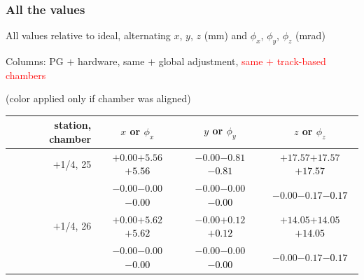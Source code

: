 \documentclass[compress]{beamer}
\begin{document}
\begin{frame}
\frametitle{All the values}
\tiny

All values relative to ideal, alternating $x$, $y$, $z$ (mm) and $\phi_x$, $\phi_y$, $\phi_z$ (mrad)

Columns: PG $+$ hardware, same $+$ global adjustment, \textcolor{red}{same $+$ track-based chambers}

\hfill (color applied only if chamber was aligned)

\vfill
\renewcommand{\arraystretch}{1.1}
\begin{tabular}{r | c | c | c}
station, chamber & $x$ or $\phi_x$ & $y$ or $\phi_y$ & $z$ or $\phi_z$ \\\hline
$+$1/4, 25 & $+0.00$\hspace{0.1 cm}$+5.56$\hspace{0.1 cm}\textcolor{black}{$+5.56$} & $-0.00$\hspace{0.1 cm}$-0.81$\hspace{0.1 cm}\textcolor{black}{$-0.81$} & $+17.57$\hspace{0.1 cm}$+17.57$\hspace{0.1 cm}\textcolor{black}{$+17.57$} \\
           & $-0.00$\hspace{0.1 cm}$-0.00$\hspace{0.1 cm}\textcolor{black}{$-0.00$} & $-0.00$\hspace{0.1 cm}$-0.00$\hspace{0.1 cm}\textcolor{black}{$-0.00$} & $-0.00$\hspace{0.1 cm}$-0.17$\hspace{0.1 cm}\textcolor{black}{$-0.17$} \\
$+$1/4, 26 & $+0.00$\hspace{0.1 cm}$+5.62$\hspace{0.1 cm}\textcolor{black}{$+5.62$} & $-0.00$\hspace{0.1 cm}$+0.12$\hspace{0.1 cm}\textcolor{black}{$+0.12$} & $+14.05$\hspace{0.1 cm}$+14.05$\hspace{0.1 cm}\textcolor{black}{$+14.05$} \\
           & $-0.00$\hspace{0.1 cm}$-0.00$\hspace{0.1 cm}\textcolor{black}{$-0.00$} & $-0.00$\hspace{0.1 cm}$-0.00$\hspace{0.1 cm}\textcolor{black}{$-0.00$} & $-0.00$\hspace{0.1 cm}$-0.17$\hspace{0.1 cm}\textcolor{black}{$-0.17$} \\

\end{tabular}
\end{frame}
\end{document}
